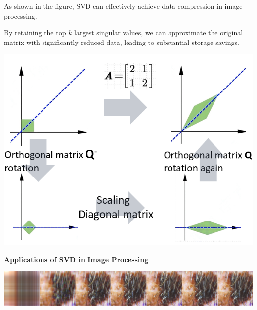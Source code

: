 \documentclass[a1paper,portrait,margin=0.8cm]{baposter}
\begin{document}
\begin{poster}
{\begin{minipage}[b]{0.48\textwidth}
\vspace{-1.5em}

As shown in the figure, SVD can effectively achieve data compression in image processing. 

\begin{minipage}[b]{0.43\textwidth}
By retaining the top $k$ largest singular values, we can approximate the original matrix with significantly reduced data, leading to substantial storage savings. 
\end{minipage}
\hfill
\begin{minipage}[b]{0.55\textwidth}
    \includegraphics[width=\linewidth+1em]{SVD.jpg}
\end{minipage}

\vspace{-0.5em}

\end{minipage}

\vspace{0.4em}

\noindent \textbf{Applications of SVD in Image Processing} 

\vspace{0.3em}

\includegraphics[width=\linewidth]{svd_compress.png}

}
\end{poster}
\end{document}
